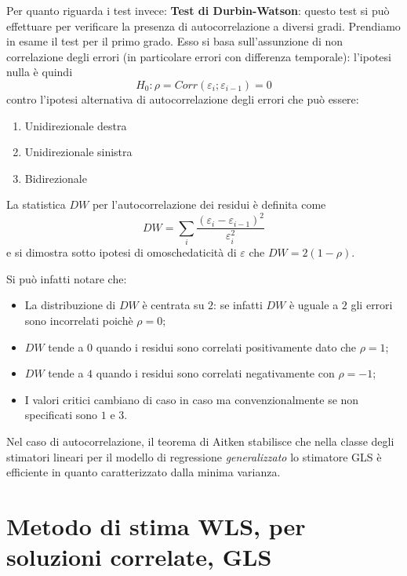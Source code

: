 \documentclass[a4page, 11pt]{article} %
\begin{document}
Per quanto riguarda i test invece:
\newline
\textbf{Test di Durbin-Watson}: questo test si può effettuare per verificare la presenza di autocorrelazione a diversi gradi. 
Prendiamo in esame il test per il primo grado. Esso si basa sull’assunzione di non correlazione degli errori (in particolare errori con differenza temporale): l’ipotesi nulla è quindi \begin{equation*}
H_0:  \rho = Corr( \varepsilon_i  ;\varepsilon_{i-1} )=0
\end{equation*}
contro l’ipotesi alternativa di autocorrelazione degli errori che può essere:
\begin{enumerate}[noitemsep]
\item Unidirezionale destra
\item Unidirezionale sinistra
\item Bidirezionale	
\end{enumerate}

La statistica $DW$ per l'autocorrelazione dei residui è definita come 
\[
DW=\sum_{i}\frac{(\varepsilon_i - \varepsilon_{i-1})^2}{ \varepsilon_i^2}
\]
e si dimostra sotto ipotesi di omoschedaticità di $\varepsilon$ che $DW = 2(1-\rho)$. 

Si può infatti notare che: 
\begin{itemize}[noitemsep]
\item La distribuzione di $DW$ è centrata su $2$: se infatti $DW$ è uguale a $2$ gli errori sono incorrelati poichè $\rho = 0$; 
\item $DW$ tende a $0$ quando i residui sono correlati positivamente dato che $\rho = 1$;
\item $DW$ tende a $4$ quando i residui sono correlati negativamente con $\rho = -1$; 
\item I valori critici cambiano di caso in caso ma convenzionalmente se non specificati sono $1$ e $3$. 

\end{itemize}
Nel caso di autocorrelazione, il teorema di Aitken stabilisce che nella classe degli stimatori lineari per il modello di regressione \textit{generalizzato} lo stimatore GLS è efficiente in quanto caratterizzato dalla minima varianza. 


\section{Metodo di stima WLS, per soluzioni correlate, GLS }
\end{document}
